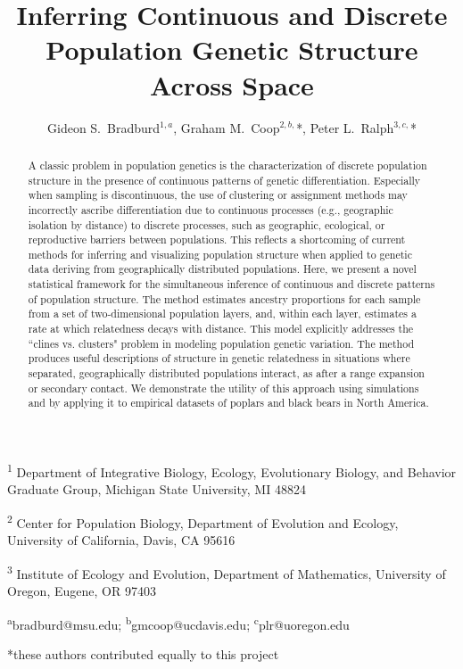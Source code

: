 \documentclass[12pt]{article}
\title{Inferring Continuous and Discrete Population Genetic Structure Across Space}
\date{\vspace{-5ex}}
\author{
Gideon S.\ Bradburd$^{1,a}$, 
Graham M.\ Coop$^{2,b,}$*,
Peter L.\ Ralph$^{3,c,}$*}
\begin{document}
\maketitle

\textsuperscript{1}
Department of Integrative Biology, 
Ecology, Evolutionary Biology, and Behavior Graduate Group,
Michigan State University, MI 48824

\textsuperscript{2}
Center for Population Biology,
Department of Evolution and Ecology, 
University of California, Davis, CA 95616

\textsuperscript{3}
Institute of Ecology and Evolution,
Department of Mathematics,
University of Oregon, Eugene, OR 97403

\textsuperscript{a}bradburd@msu.edu; 
\textsuperscript{b}gmcoop@ucdavis.edu;
\textsuperscript{c}plr@uoregon.edu

*these authors contributed equally to this project
\newpage
 
\begin{abstract}
A classic problem in population genetics is the characterization 
of discrete population structure in the presence of 
continuous patterns of genetic differentiation.
Especially when sampling is discontinuous, 
the use of clustering or assignment methods may incorrectly ascribe
differentiation due to continuous processes (e.g., geographic isolation by distance)
to discrete processes, such as geographic, ecological, or reproductive barriers 
between populations.
This reflects a shortcoming of current methods for inferring and 
visualizing population structure when applied to genetic data
deriving from geographically distributed populations.
Here, we present a novel statistical framework for the simultaneous inference 
of continuous and discrete patterns of population structure.
The method estimates ancestry proportions for each 
sample from a set of two-dimensional population layers, 
and, within each layer, estimates a rate at which relatedness decays with distance.
This model explicitly addresses the ``clines vs. clusters" problem in 
modeling population genetic variation.
The method produces useful descriptions of structure in genetic relatedness
in situations where separated, geographically distributed populations interact,
as after a range expansion or secondary contact.
We demonstrate the utility of this approach using simulations 
and by applying it to empirical datasets of poplars and black bears in North America.
\end{abstract}
\end{document}
